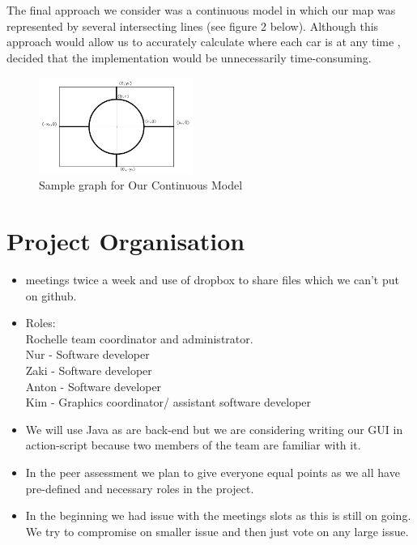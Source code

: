 \documentclass[11pt]{article}
\begin{document}
\\\\
The final approach we consider was a continuous model in which our map was represented by several intersecting lines (see figure 2 below). Although this approach would allow us to accurately calculate where each car is at any time , decided that the implementation would be unnecessarily time-consuming.  

\FloatBarrier
\begin{figure}
	\centering
	\includegraphics[width=0.45\textwidth]{KimsModel}
	\caption{Sample graph for Our Continuous Model}
\end{figure}

\section{Project Organisation}
\begin{itemize}
\item meetings twice a week and use of dropbox to share files which we can't put on github. 
\item Roles:\\
Rochelle team coordinator and administrator. \\
Nur - Software developer\\
Zaki - Software developer \\
Anton - Software developer \\
Kim - Graphics coordinator/ assistant software developer  
\end{itemize}
\begin{itemize}

\item We will use Java as are back-end but we are considering writing our GUI in action-script because two members of the team are familiar with it. 
\item In the peer assessment we plan to give everyone equal points as we all have pre-defined and necessary roles in the project. 
\item In the beginning we had issue with the meetings slots as this is still on going. We try to compromise on smaller issue and then just vote on any large issue.  

\end{itemize}
\end{document}
